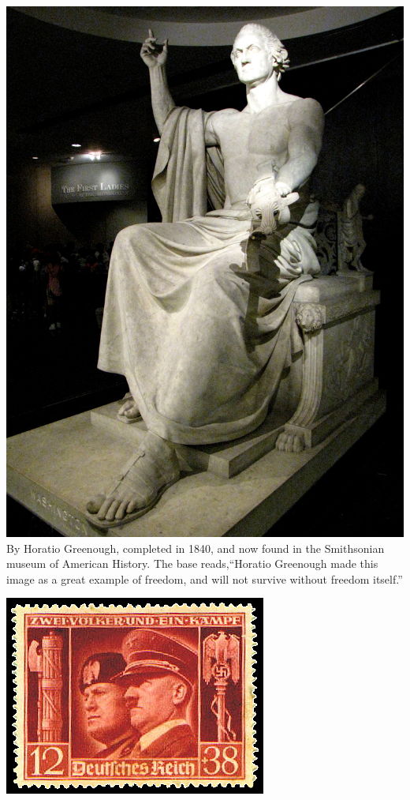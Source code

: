 \begin{frame}
    \centering
    \includegraphics[height=.8\textheight]{img/fasces/washington1.jpg} \\
    By Horatio Greenough, completed in 1840, and now found in the Smithsonian
    museum of American History. The base reads,``Horatio Greenough made this
    image as a great example of freedom, and will not survive without freedom
    itself.''
\end{frame}

\begin{frame}
    \centering
    \includegraphics[width=.9\textwidth]{img/reich-stamp.png} \\
\end{frame}

